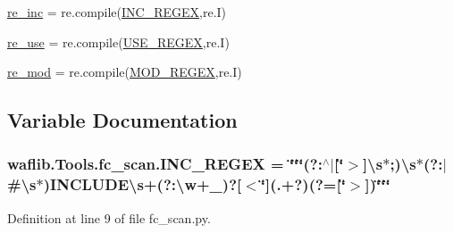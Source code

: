 \begin{DoxyCompactItemize}
$$\item 
\hyperlink{namespacewaflib_1_1_tools_1_1fc__scan_a5014e5563805e1607e7328dd50565b8b}{re\+\_\+inc} = re.\+compile(\hyperlink{namespacewaflib_1_1_tools_1_1fc__scan_a72e8f5f8af6a3ff133f559b4737eefb1}{I\+N\+C\+\_\+\+R\+E\+G\+EX},re.\+I)
\item 
\hyperlink{namespacewaflib_1_1_tools_1_1fc__scan_a9043d572c800bcbb048a13407bb5141f}{re\+\_\+use} = re.\+compile(\hyperlink{namespacewaflib_1_1_tools_1_1fc__scan_a7c5bb532a0b53496b1ff8b1fb781036d}{U\+S\+E\+\_\+\+R\+E\+G\+EX},re.\+I)
\item 
\hyperlink{namespacewaflib_1_1_tools_1_1fc__scan_a04dfeeea8d0f2bdb0665c27d8daca9a3}{re\+\_\+mod} = re.\+compile(\hyperlink{namespacewaflib_1_1_tools_1_1fc__scan_a4ae91a93a39e63e74b5cfdaaaaf8f689}{M\+O\+D\+\_\+\+R\+E\+G\+EX},re.\+I)
\end{DoxyCompactItemize}


\subsection{Variable Documentation}
\subsubsection[{\texorpdfstring{I\+N\+C\+\_\+\+R\+E\+G\+EX}{INC_REGEX}}]{ waflib.\+Tools.\+fc\+\_\+scan.\+I\+N\+C\+\_\+\+R\+E\+G\+EX = \char`\"{}\char`\"{}\char`\"{}(?\+:$^\wedge$$\vert$\mbox{[}\textquotesingle{}\char`\"{}$>$\mbox{]}\textbackslash{}{\bf s}$\ast$;)\textbackslash{}{\bf s}$\ast$(?\+:$\vert$\#\textbackslash{}{\bf s}$\ast$){\bf I\+N\+C\+L\+U\+D\+E\textbackslash{}s}+(?\+:\textbackslash{}w+{\bf \+\_\+})?\mbox{[}$<$\char`\"{}\textquotesingle{}\mbox{]}(.+?)(?=\mbox{[}\char`\"{}\textquotesingle{}$>$\mbox{]})\char`\"{}\char`\"{}\char`\"{}}\hypertarget{namespacewaflib_1_1_tools_1_1fc__scan_a72e8f5f8af6a3ff133f559b4737eefb1}{}\label{namespacewaflib_1_1_tools_1_1fc__scan_a72e8f5f8af6a3ff133f559b4737eefb1}


Definition at line 9 of file fc\+\_\+scan.\+py.

